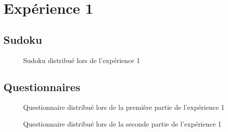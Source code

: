 \documentclass[12pt,fleqn,oneside,openany]{book} %
\begin{document}
\section*{Expérience 1}

\subsection*{Sudoku} \label{sec:Sudoku}
\begin{figure}[htp]  %
	\caption{Sudoku distribué lors de l'expérience 1}
\end{figure}  

\clearpage
\subsection*{Questionnaires} \label{sec:Questionnaires}
\begin{figure}[htp] 
	\caption{Questionnaire distribué lors de la première partie de l'expérience 1}
\end{figure}

\clearpage
\begin{figure}[htp] 
	\caption{Questionnaire distribué lors de la seconde partie de l'expérience 1}
\end{figure}
\end{document}
